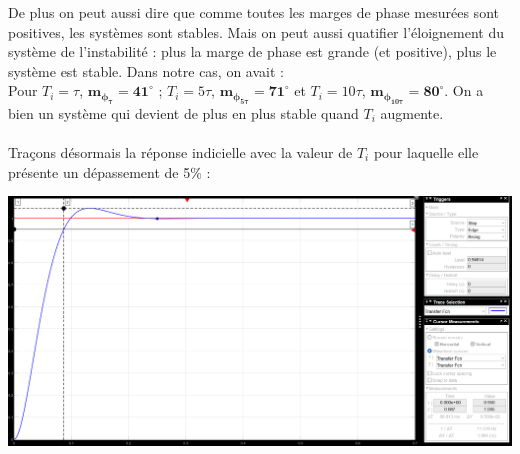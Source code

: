 \documentclass[12pt]{article}
\begin{document}
De plus on peut aussi dire que comme toutes les marges de phase mesurées sont positives, les systèmes sont stables. Mais on peut aussi quatifier l'éloignement du système de l'instabilité : plus la marge de phase est grande (et positive), plus le système est stable. Dans notre cas, on avait :
\\Pour $T_i = \tau$, $\mathbf{m_{\phi_{\tau}} = 41^{\circ}}$  ; $T_i = 5\tau$, $\mathbf{m_{\phi_{5\tau}} = 71^{\circ}}$ et $T_i = 10\tau$, $\mathbf{m_{\phi_{10\tau}} = 80^{\circ}}$.
On a bien un système qui devient de plus en plus stable quand $T_i$ augmente.
\\\\Traçons désormais la réponse indicielle avec la valeur de $T_i$ pour laquelle elle présente un dépassement de 5$\%$ : 
\begin{center}
    \includegraphics[width = 19 cm]{TP2 Simulink/Syst_1/dep5prct_syst1.png}
\end{center}
\end{document}
